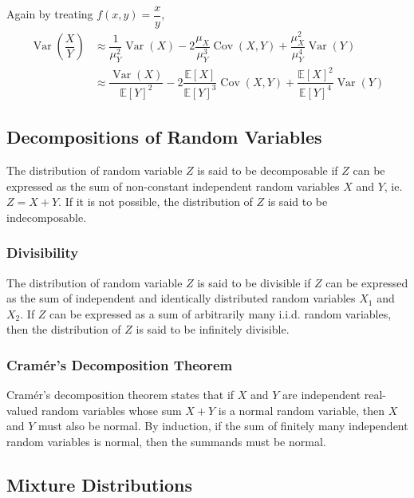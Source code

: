 \documentclass[11pt]{report} %
\begin{document}
Again by treating $f\left(x, y\right) = \dfrac{x}{y}$, 
\begin{align}
\operatorname{Var}\left(\dfrac{X}{Y}\right) &\approx \dfrac{1}{\mu_{Y}^{2}}\operatorname{Var}\left(X\right) - 2\dfrac{\mu_{X}}{\mu_{Y}^{3}}\operatorname{Cov}\left(X, Y\right) + \dfrac{\mu_{X}^{2}}{\mu_{Y}^{4}}\operatorname{Var}\left(Y\right) \\
&\approx \dfrac{\operatorname{Var}\left(X\right)}{\mathbb{E}\left[Y\right]^{2}} - 2\dfrac{\mathbb{E}\left[X\right]}{\mathbb{E}\left[Y\right]^{3}}\operatorname{Cov}\left(X, Y\right) + \dfrac{\mathbb{E}\left[X\right]^{2}}{\mathbb{E}\left[Y\right]^{4}}\operatorname{Var}\left(Y\right)
\end{align}

\subsection{Decompositions of Random Variables}

The distribution of random variable $Z$ is said to be decomposable if $Z$ can be expressed as the sum of non-constant independent random variables $X$ and $Y$, ie. $Z = X + Y$. If it is not possible, the distribution of $Z$ is said to be indecomposable.

\subsubsection{Divisibility}

The distribution of random variable $Z$ is said to be divisible if $Z$ can be expressed as the sum of independent and identically distributed random variables $X_{1}$ and $X_{2}$. If $Z$ can be expressed as a sum of arbitrarily many i.i.d. random variables, then the distribution of $Z$ is said to be infinitely divisible.

\subsubsection{Cram\'{e}r's Decomposition Theorem}

Cram\'{e}r's decomposition theorem states that if $X$ and $Y$ are independent real-valued random variables whose sum $X + Y$ is a normal random variable, then $X$ and $Y$ must also be normal. By induction, if the sum of finitely many independent random variables is normal, then the summands must be normal. 

\subsection{Mixture Distributions}
\end{document}

